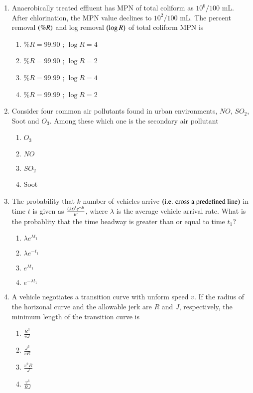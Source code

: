 \documentclass[journal,onecolumn]{IEEEtran}
\theoremstyle{remark}
\begin{document}
\begin{enumerate}
    \item Anaerobically treated effluent has MPN of total coliform as $10^6/100$ mL. After chlorination, the MPN value declines to $10^2/100$ mL. The percent removal $\left(\%R\right)$ and log removal $\left(\log R\right)$ of total coliform MPN is

	\begin{enumerate}
		\item $\%R = 99.90$ ; $\log R = 4$
		\item $\%R = 99.90$ ; $\log R = 2$
		\item $\%R = 99.99$ ; $\log R = 4$
		\item $\%R = 99.99$ ; $\log R = 2$
	\end{enumerate}


    \item Consider four common air pollutants found in urban environments, $NO$, $SO_2$, Soot and $O_3$. Among these which one is the secondary air pollutant
	
	\begin{enumerate}
		\item $O_3$
		\item $NO$
		\item $SO_2$
		\item Soot
	\end{enumerate}


    \item The probability that $k$ number of vehicles arrive $\left(\text{i.e. cross a predefined line}\right)$ in time $t$ is given as $\frac{\left(\lambda t\right)^k e^{-\lambda t}}{k!}$, where $\lambda$ is the average vehicle arrival rate. What is the probablity that the time headway is greater than or equal to time $t_1$?

	\begin{enumerate}
		\item $\lambda e^{\lambda t_1}$
		\item $\lambda e^{-t_1}$
		\item $e^{\lambda t_1}$
		\item $e^{-\lambda t_1}$
	\end{enumerate}


    \item A vehicle negotiates a transition curve with unform speed $v$. If the radius of the horizonal curve and the allowable jerk are $R$ and $J$, respectively, the minimum length of the transition curve is

	\begin{enumerate}
		\item $\frac{R^3}{vJ}$
		\item $\frac{J^3}{vR}$
		\item $\frac{v^2R}{J}$
		\item $\frac{v^3}{RJ}$
	\end{enumerate}



\end{enumerate}
\end{document}
